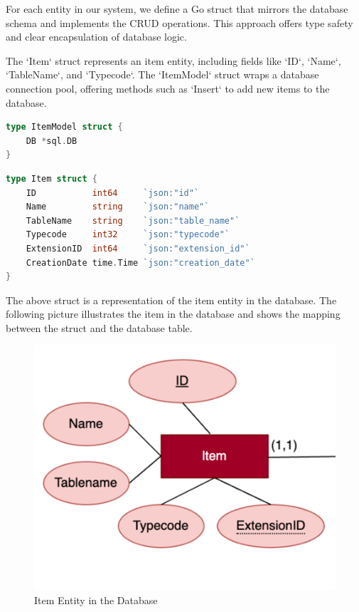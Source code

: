 For each entity in our system, we define a Go struct that mirrors the database schema and implements the CRUD operations.
This approach offers type safety and clear encapsulation of database logic.

The `Item` struct represents an item entity, including fields like `ID`, `Name`, `TableName`, and `Typecode`.
The `ItemModel` struct wraps a database connection pool, offering methods such as `Insert` to add new items to the database.

\begin{lstlisting}[language=Go,label={lst:lstlisting17}]
type ItemModel struct {
	DB *sql.DB
}
\end{lstlisting}

\begin{lstlisting}[language=Go,label={lst:lstlisting2}]
type Item struct {
    ID           int64     `json:"id"`
    Name         string    `json:"name"`
    TableName    string    `json:"table_name"`
    Typecode     int32     `json:"typecode"`
    ExtensionID  int64     `json:"extension_id"`
    CreationDate time.Time `json:"creation_date"`
}
\end{lstlisting}

The above struct is a representation of the item entity in the database.
The following picture illustrates the item in the database and shows the mapping between the struct and the database table.

\begin{figure}[ht]
    \centering
    \includegraphics[scale=0.4]{./images/database/item_er}
    \caption{Item Entity in the Database}
    \label{fig:item_database_model}
\end{figure}

